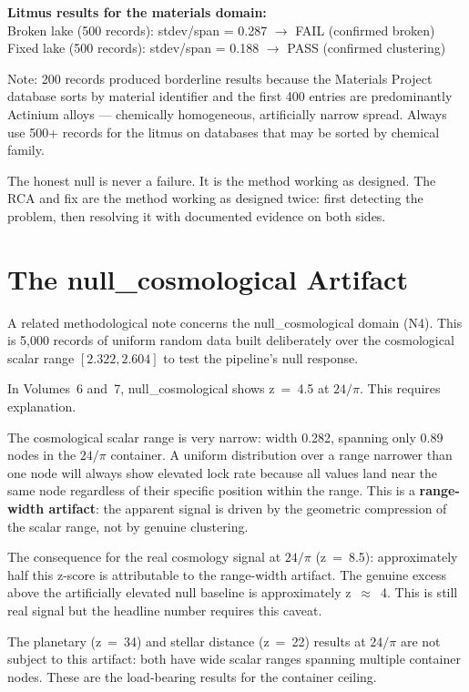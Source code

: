 \documentclass[11pt, letterpaper, openany]{book}
\begin{document}
\textbf{Litmus results for the materials domain:}\\
Broken lake (500 records): stdev/span = 0.287 $\rightarrow$ FAIL (confirmed broken)\\
Fixed lake (500 records): stdev/span = 0.188 $\rightarrow$ PASS (confirmed clustering)

Note: 200 records produced borderline results because the Materials Project database
sorts by material identifier and the first 400 entries are predominantly Actinium
alloys --- chemically homogeneous, artificially narrow spread. Always use 500+ records
for the litmus on databases that may be sorted by chemical family.

The honest null is never a failure. It is the method working as designed.
The RCA and fix are the method working as designed twice: first detecting the problem,
then resolving it with documented evidence on both sides.

\section*{The null\_cosmological Artifact}

A related methodological note concerns the null\_cosmological domain (N4). This is
5,000 records of uniform random data built deliberately over the cosmological scalar
range $[2.322, 2.604]$ to test the pipeline's null response.

In Volumes~6 and~7, null\_cosmological shows z~=~4.5 at $24/\pi$. This requires
explanation.

The cosmological scalar range is very narrow: width 0.282, spanning only 0.89 nodes in
the $24/\pi$ container. A uniform distribution over a range narrower than one node will
always show elevated lock rate because all values land near the same node regardless of
their specific position within the range. This is a \textbf{range-width artifact}: the
apparent signal is driven by the geometric compression of the scalar range, not by
genuine clustering.

The consequence for the real cosmology signal at $24/\pi$ (z~=~8.5): approximately
half this z-score is attributable to the range-width artifact. The genuine excess above
the artificially elevated null baseline is approximately z~$\approx$~4. This is still
real signal but the headline number requires this caveat.

The planetary (z~=~34) and stellar distance (z~=~22) results at $24/\pi$ are not
subject to this artifact: both have wide scalar ranges spanning multiple container
nodes. These are the load-bearing results for the container ceiling.
\end{document}
